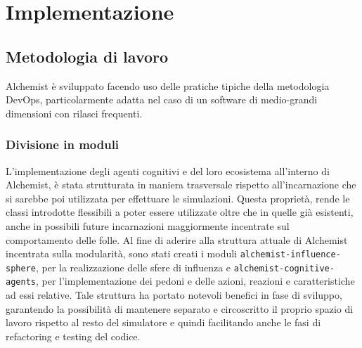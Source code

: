 \section{Implementazione}

\subsection{Metodologia di lavoro}
Alchemist è sviluppato facendo uso delle pratiche tipiche della metodologia DevOps, particolarmente adatta nel caso di un software di medio-grandi dimensioni con rilasci frequenti.

\subsubsection{Divisione in moduli}
L'implementazione degli agenti cognitivi e del loro ecosistema all'interno di Alchemist, è stata strutturata in maniera trasversale rispetto all'incarnazione che si sarebbe poi utilizzata per effettuare le simulazioni. Questa proprietà, rende le classi introdotte flessibili a poter essere utilizzate oltre che in quelle già esistenti, anche in possibili future incarnazioni maggiormente incentrate sul comportamento delle folle. \newline
Al fine di aderire alla struttura attuale di Alchemist incentrata sulla modularità, sono stati creati i moduli \texttt{alchemist-influence-sphere}, per la realizzazione delle sfere di influenza e \texttt{alchemist-cognitive-agents}, per l'implementazione dei pedoni e delle azioni, reazioni e caratteristiche ad essi relative. \newline
Tale struttura ha portato notevoli benefici in fase di sviluppo, garantendo la possibilità di mantenere separato e circoscritto il proprio spazio di lavoro rispetto al resto del simulatore e quindi facilitando anche le fasi di refactoring e testing del codice.

